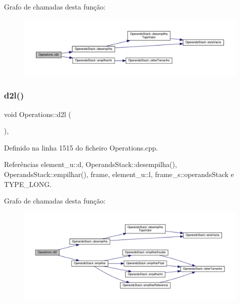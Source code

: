 Grafo de chamadas desta função\+:\nopagebreak
\begin{figure}[H]
\begin{center}
\leavevmode
\includegraphics[width=350pt]{classOperations_aa8cda1c04343e047078b72b51c575e1c_cgraph}
\end{center}
\end{figure}
\mbox{\label{classOperations_a2babf3c9e2ac30a70a07f8d43b32440a}} 
\subsubsection{\texorpdfstring{d2l()}{d2l()}}
{\footnotesize\ttfamily void Operations\+::d2l (\begin{DoxyParamCaption}{ }\end{DoxyParamCaption})\hspace{0.3cm}{\ttfamily [static]}, {\ttfamily [private]}}



Definido na linha 1515 do ficheiro Operations.\+cpp.



Referências element\+\_\+u\+::d, Operands\+Stack\+::desempilha(), Operands\+Stack\+::empilhar(), frame, element\+\_\+u\+::l, frame\+\_\+s\+::operands\+Stack e T\+Y\+P\+E\+\_\+\+L\+O\+NG.

Grafo de chamadas desta função\+:\nopagebreak
\begin{figure}[H]
\begin{center}
\leavevmode
\includegraphics[width=350pt]{classOperations_a2babf3c9e2ac30a70a07f8d43b32440a_cgraph}
\end{center}
\end{figure}
\mbox{\label{classOperations_a8a23241bed8c033ab75994a18bf2a702}} 

